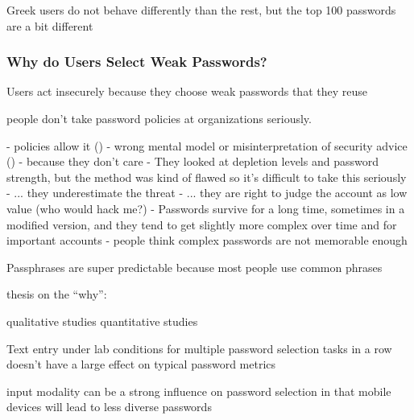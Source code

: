 	Greek users do not behave differently than the rest, but the top 100 passwords are a bit different \cite{Violettas2014PasswordsAvoidGreece}
	
	
	\cite{Li2017PersonalInformation}

	\subsubsection{Why do Users Select Weak Passwords?}
	
	Users act insecurely because they choose weak passwords that they reuse \cite{Riley2006WhatUsersKnowWhatTheyDo}
	
	people don't take password policies at organizations seriously.  \cite{Weirich2005PersuasivePasswordSecurity}
	
	- policies allow it (\cite{Seitz2017PoliciesReuse})
	- wrong mental model or misinterpretation of security advice (\cite{Ur2015PWCreationLab, Ur2016PerceptionsPassword, Seitz2017PASDJO})
	- because they don't care
	- They looked at depletion levels and password strength, but the method was kind of flawed so it's difficult to take this seriously \cite{Gross2016EffectCognitiveEffort}
	- ... they underestimate the threat
	- ... they are right to judge the account as low value (who would hack me?) \cite{LastPass2016PersonalitiesGetUsHacked}
	- Passwords survive for a long time, sometimes in a modified version, and they tend to get slightly more complex over time and for important accounts\cite{VonZezschwitz2013SurvivalShortest}
	- people think complex passwords are not memorable enough \cite{Woods2018TooManyPasswords}
	
	Passphrases are super predictable because most people use common phrases \cite{Bonneau2012LinguisticProperties}
	
	\cite{Wang2015ChinesePWs}
	
	thesis on the ``why'': \cite{Notoatmodjo2007ExploringWeakestLink}
	
	qualitative studies \cite{Ur2015PWCreationLab, Stobert2014PasswordLifeCycle} 
	quantitative studies \cite{Ur2016PerceptionsPassword, Seitz2017PASDJO}
	
	
	Text entry under lab conditions for multiple password selection tasks in a row doesn't have a large effect on typical password metrics \cite{Yang2014EntryAffectsPasswordSecurity}
	
	input modality can be a strong influence on password selection in that mobile devices will lead to less diverse passwords \cite{VonZezschwitz2014HoneyIShrunkTheKeys}
	
